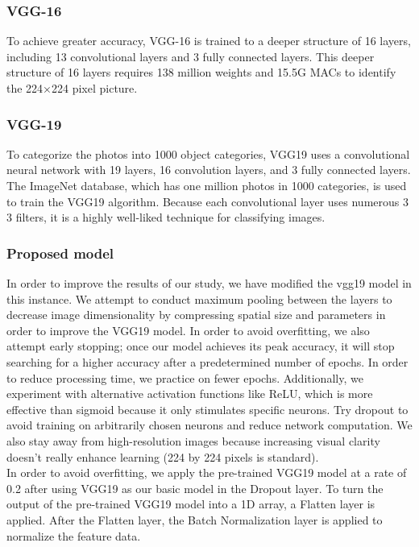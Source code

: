 \documentclass[conference]{IEEEtran}
\begin{document}
\subsubsection{VGG-16}
To achieve greater accuracy, VGG-16 is trained to a deeper structure of 16 layers, including 13 convolutional layers and 3 fully connected layers. This deeper structure of 16 layers requires 138 million weights and 15.5G MACs to identify the 224×224 pixel picture.
\subsubsection{VGG-19}
To categorize the photos into 1000 object categories, VGG19 uses a convolutional neural network with 19 layers, 16 convolution layers, and 3 fully connected layers. The ImageNet database, which has one million photos in 1000 categories, is used to train the VGG19 algorithm. Because each convolutional layer uses numerous 3 3 filters, it is a highly well-liked technique for classifying images.

\subsubsection{Proposed model}
In order to improve the results of our study, we have modified the vgg19 model in this instance. We attempt to conduct maximum pooling between the layers to decrease image dimensionality by compressing spatial size and parameters in order to improve the VGG19 model. In order to avoid overfitting, we also attempt early stopping; once our model achieves its peak accuracy, it will stop searching for a higher accuracy after a predetermined number of epochs. In order to reduce processing time, we practice on fewer epochs. Additionally, we experiment with alternative activation functions like ReLU, which is more effective than sigmoid because it only stimulates specific neurons. Try dropout to avoid training on arbitrarily chosen neurons and reduce network computation. We also stay away from high-resolution images because increasing visual clarity doesn't really enhance learning (224 by 224 pixels is standard).\vspace{1mm}\\

In order to avoid overfitting, we apply the pre-trained VGG19 model at a rate of 0.2 after using VGG19 as our basic model in the Dropout layer. To turn the output of the pre-trained VGG19 model into a 1D array, a Flatten layer is applied. After the Flatten layer, the Batch Normalization layer is applied to normalize the feature data.
\end{document}
